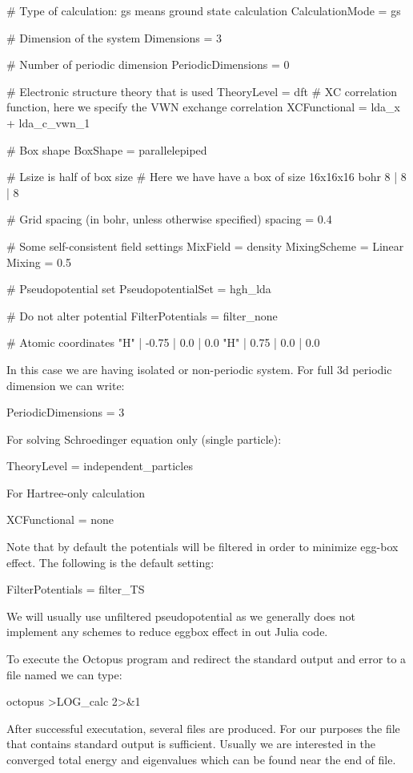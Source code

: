 \begin{textcode}
# Type of calculation: gs means ground state calculation
CalculationMode = gs

# Dimension of the system
Dimensions = 3

# Number of periodic dimension
PeriodicDimensions = 0

# Electronic structure theory that is used
TheoryLevel = dft
# XC correlation function, here we specify the VWN exchange correlation
XCFunctional = lda_x + lda_c_vwn_1

# Box shape
BoxShape = parallelepiped

# Lsize is half of box size
# Here we have have a box of size 16x16x16 bohr
 8 | 8 | 8
%

# Grid spacing (in bohr, unless otherwise specified)
spacing = 0.4

# Some self-consistent field settings
MixField = density
MixingScheme = Linear
Mixing = 0.5

# Pseudopotential set
PseudopotentialSet = hgh_lda

# Do not alter potential
FilterPotentials = filter_none

# Atomic coordinates
  "H" | -0.75 | 0.0 | 0.0
  "H" |  0.75 | 0.0 | 0.0
%
\end{textcode}

In this case we are having isolated or non-periodic system.
For full 3d periodic dimension we can write:
\begin{textcode}
PeriodicDimensions = 3
\end{textcode}

For solving Schroedinger equation only (single particle):
\begin{textcode}
TheoryLevel = independent_particles
\end{textcode}

For Hartree-only calculation
\begin{textcode}
XCFunctional = none
\end{textcode}

Note that by default the potentials will be filtered in order to minimize egg-box effect.
The following is the default setting:
\begin{textcode}
FilterPotentials = filter_TS
\end{textcode}
We will usually use unfiltered pseudopotential as we generally does not implement any
schemes to reduce eggbox effect in out Julia code.

To execute the \textsf{Octopus} program and redirect the standard output and error to a
file named  we can type:
\begin{textcode}
octopus >LOG_calc 2>&1
\end{textcode}
After successful executation, several files are produced. For our purposes the
 file that contains standard output is sufficient. Usually we
are interested in the converged total energy and eigenvalues which can be found
near the end of  file.

